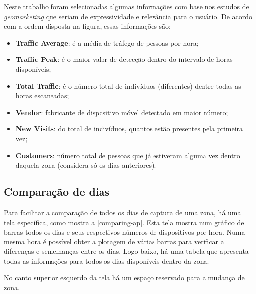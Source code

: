 Neste trabalho foram selecionadas algumas informações com base nos estudos de \emph{geomarketing} que seriam
de expressividade e relevância para o usuário. De acordo com a ordem disposta
na figura, essas informações são:

\begin{itemize}
    \item \textbf{Traffic Average}: é a média de tráfego de pessoas por hora;
    \item \textbf{Traffic Peak}: é o maior valor de detecção dentro do intervalo de horas disponíveis;
    \item \textbf{Total Traffic}: é o número total de indivíduos (diferentes) dentre todas as horas escaneadas;
    \item \textbf{Vendor}: fabricante de dispositivo móvel detectado em maior número;
    \item \textbf{New Visits}: do total de indivíduos, quantos estão presentes pela primeira vez;
    \item \textbf{Customers}: número total de pessoas que já estiveram alguma vez dentro daquela zona (considera só os dias anteriores).
\end{itemize}

\subsection{Comparação de dias}
Para facilitar a comparação de todos os dias de captura de uma zona, há uma tela
específica, como mostra a \autoref{comparing-ap}. Esta tela mostra num
gráfico de barras todos os dias e seus respectivos números de dispositivos por
hora. Numa mesma hora é possível obter a plotagem de várias barras para verificar
a diferenças e semelhanças entre os dias. Logo baixo, há uma tabela que
apresenta todas as informações para todos os dias disponíveis dentro da zona.

No canto superior esquerdo da tela há um espaço reservado para a mudança de zona.

